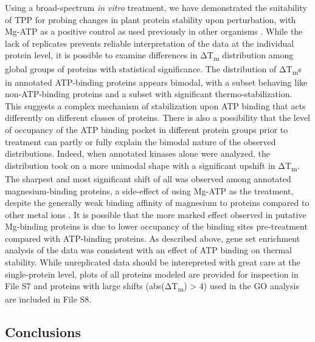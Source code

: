 \documentclass[11pt,letter]{article}\usepackage[]{graphicx}\usepackage[]{color}
\newcommand{\Tm}{T\textsubscript{m}}
\newcommand{\DeltaTm}{Δ\Tm}
\begin{document}
Using a broad-spectrum \textit{in vitro} treatment, we have demonstrated the
suitability of TPP for probing changes in plant protein stability upon
perturbation, with Mg-ATP as a positive control as used previously in other
organisms \cite{savitski_tracking_2014}. While the lack of replicates prevents
reliable interpretation of the data at the individual protein level, it is
possible to examine differences in \DeltaTm{} distribution among global groups
of proteins with statistical significance. The distribution of \DeltaTm{}s in
annotated ATP-binding proteins appears bimodal, with a subset behaving like
non-ATP-binding proteins and a subset with significant thermo-stabilization.
This suggests a complex mechanism of stabilization upon ATP binding that acts
differently on different classes of proteins. There is also a possibility that
the level of occupancy of the ATP binding pocket in different protein groups
prior to treatment can partly or fully explain the bimodal nature of the
observed distributions. Indeed, when annotated kinases alone were analyzed,
the distribution took on a more unimodal shape with a significant upshift
in \DeltaTm{}. The sharpest and most significant shift of all was observed
among annotated magnesium-binding proteins, a side-effect of using Mg-ATP as
the treatment, despite the generally weak binding affinity of magnesium to
proteins compared to other metal ions \cite{foster_metal_2014}. It is possible
that the more marked effect observed in putative Mg-binding proteins is due to
lower occupancy of the binding sites pre-treatment compared with ATP-binding
proteins. As described above, gene set enrichment analysis of the data was
consistent with an effect of ATP binding on thermal stability. While
unreplicated data should be interepreted with great care at the single-protein
level, plots of all proteins modeled are provided for inspection in File
S7 and proteins with large shifts
(abs(\DeltaTm{}) > 4) used in the GO analysis are
included in File S8.

\subsection*{Conclusions}
\end{document}
